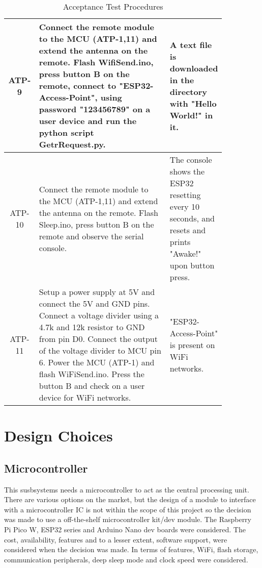 \documentclass[class=report,11pt,crop=false]{standalone}
\begin{document}
\begin{table}[H]
{\begin{tabular}{|c|p{0.6\linewidth}|p{0.25\linewidth}|}
    \hline
    ATP-9 & Connect the remote module to the MCU (ATP-1,11) and extend the antenna on the remote. Flash WifiSend.ino, press button B on the remote, connect to "ESP32-Access-Point", using password "123456789" on a user device and run the python script GetrRequest.py. & A text file is downloaded in the directory with "Hello World!" in it. \\
    \hline
    ATP-10 & Connect the remote module to the MCU (ATP-1,11) and extend the antenna on the remote. Flash Sleep.ino, press button B on the remote and observe the serial console. & The console shows the ESP32 resetting every 10 seconds, and resets and prints "Awake!" upon button press. \\
    \hline
    ATP-11 & Setup a power supply at 5V and connect the 5V and GND pins. Connect a voltage divider using a 4.7k and 12k resistor to GND from pin D0. Connect the output of the voltage divider to MCU pin 6. Power the MCU (ATP-1) and flash WiFiSend.ino. Press the button B and check on a user device for WiFi networks. & "ESP32-Access-Point" is present on WiFi networks. \\
    \hline
    \end{tabular}}
\caption{Acceptance Test Procedures}
\label{tab:atp}
\end{table}

\section{Design Choices}
\subsection*{Microcontroller}
This susbsystems needs a microcontroller to act as the central processing unit. There are various options on the market, but the design of a module to interface with a microcontroller IC is not within the scope of this project so the decision was made to use a off-the-shelf microcontroller kit/dev module. The Raspberry Pi Pico W, ESP32 series and Arduino Nano dev boards were considered. The cost, availability, features and to a lesser extent, software support, were considered when the decision was made. In terms of features, WiFi, flash storage, communication peripherals, deep sleep mode and clock speed were considered. 
\end{document}
